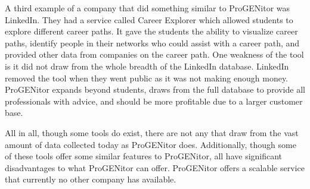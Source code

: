 A third example of a company that did something similar to ProGENitor was
LinkedIn.  They had a service called Career Explorer\cite{careerexplorer} which
allowed students to explore different career paths.  It gave the students the
ability to visualize career paths, identify people in their networks who could
assist with a career path, and provided other data from companies on the career
path.  One weakness of the tool is it did not draw from the whole breadth of the
LinkedIn database.  LinkedIn removed the tool when they went public as it was
not making enough money.  ProGENitor expands beyond students, draws from the
full database to provide all professionals with advice, and should be more
profitable due to a larger customer base.

All in all, though some tools do exist, there are not any that draw from the
vast amount of data collected today as ProGENitor does.  Additionally, though
some of these tools offer some similar features to ProGENitor, all have
significant disadvantages to what ProGENitor can offer.  ProGENitor offers a
scalable service that currently no other company has available.
